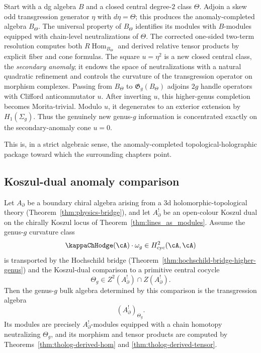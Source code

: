 Start with a dg algebra \(B\) and a closed central degree-\(2\) class \(\Theta\).
Adjoin a skew odd transgression generator \(\eta\) with \(d\eta=\Theta\); this produces the anomaly-completed algebra \(B_{\Theta}\).
The universal property of \(B_{\Theta}\) identifies its modules with \(B\)-modules equipped with chain-level neutralizations of \(\Theta\).
The corrected one-sided two-term resolution computes both
\(R\!\operatorname{Hom}_{B_{\Theta}}\) and derived relative tensor products by explicit fiber and cone formulas.
The square \(u=\eta^{2}\) is a new closed central class, the \emph{secondary anomaly}; it endows the space of neutralizations with a natural quadratic refinement and controls the curvature of the transgression operator on morphism complexes.
Passing from \(B_{\Theta}\) to \(\mathfrak{G}_{g}(B_{\Theta})\) adjoins \(2g\) handle operators with Clifford anticommutator \(u\).
After inverting \(u\), this higher-genus completion becomes Morita-trivial.
Modulo \(u\), it degenerates to an exterior extension by \(H_{1}(\Sigma_{g})\).
Thus the genuinely new genus-\(g\) information is concentrated exactly on the secondary-anomaly cone \(u=0\).

This is, in a strict algebraic sense, the anomaly-completed topological-holographic package toward which the surrounding chapters point.

\subsection{Koszul-dual anomaly comparison}
\label{subsec:tholog-koszul-dual-anomaly-comparison}

\begin{theorem}
\label{thm:tholog-koszul-dual-bulk-comparison}
Let \(A_{\partial}\) be a boundary chiral algebra arising from a
3d holomorphic-topological theory
(Theorem~\ref{thm:physics-bridge}), and let \(A_{\partial}^{!}\)
be an open-colour Koszul dual on the chirally Koszul locus of
Theorem~\textup{\ref{thm:lines_as_modules}}.  Assume the genus-\(g\)
curvature class
\[
\kappaChHodge(\cA)\cdot\omega_g\in H^2_{\mathrm{cyc}}(\cA,\cA)
\]
is transported by the Hochschild bridge
(Theorem~\textup{\ref{thm:hochschild-bridge-higher-genus}}) and the
Koszul-dual comparison to a primitive central cocycle
\[
\Theta_g\in Z^2(A_\partial^!)\cap Z(A_\partial^!).
\]
Then the genus-\(g\) bulk algebra determined by this comparison is the
transgression algebra
\[
(A_\partial^!)_{\Theta_g}.
\]
Its modules are precisely \(A_\partial^!\)-modules equipped with a
chain homotopy neutralizing \(\Theta_g\), and its morphism and tensor
products are computed by
Theorems~\ref{thm:tholog-derived-hom} and
\ref{thm:tholog-derived-tensor}.
\end{theorem}


